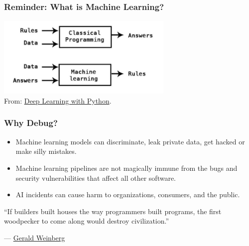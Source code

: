 \documentclass[11pt,
               aspectratio=169,
               hyperref={colorlinks}
               ]{beamer}
\begin{document}
		\subsection*{}

			\begin{frame}
				
				\frametitle{Reminder: What is Machine Learning?}
				
					\begin{center}
						\includegraphics[height=110pt]{../img/ml.jpeg}\\
						From: \href{https://www.manning.com/books/deep-learning-with-python}{Deep Learning with Python}.
					\end{center}

			\end{frame}


			\begin{frame}
				
				\frametitle{Why Debug?}
				
				\begin{itemize}
					
					\item Machine learning models can discriminate, leak private data, get hacked or make silly mistakes.
					
					\item Machine learning pipelines are not magically immune from the bugs and security vulnerabilities that affect all other software.
					
					\item AI incidents can cause harm to organizations, consumers, and the public.
			
				\end{itemize}
			
			\epigraph{“If builders built houses the way programmers built programs, the first woodpecker to come along would destroy civilization.”}{--- \textup{\href{https://en.wikiquote.org/wiki/Gerald_Weinberg}{Gerald Weinberg}}}
				
			\end{frame}
\end{document}
